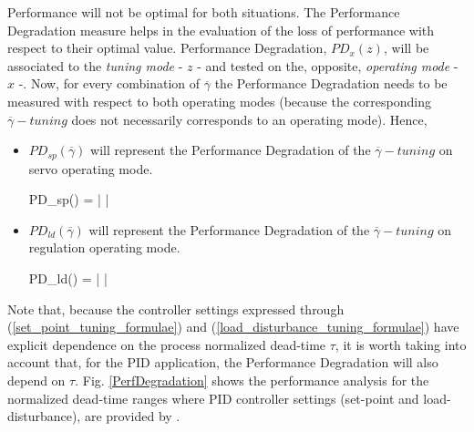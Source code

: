 Performance will not be optimal for both situations. The
Performance Degradation measure helps in the evaluation of the
loss of performance with respect to their optimal value.
Performance Degradation, $PD_x(z)$, will be associated to the
\emph{tuning mode} - $z$ -  and tested on the, opposite,
\emph{operating mode} - $x$ -. Now, for every combination of
$\overline{\gamma}$ the Performance Degradation needs to be
measured with respect to both operating modes (because the
corresponding $\overline{\gamma}-tuning$ does not necessarily
corresponds to an operating mode). Hence,

\begin{itemize}
\item $PD_{sp}(\overline{\gamma})$ will represent the Performance
Degradation of the $\overline{\gamma}-tuning$ on servo operating
mode.

\be PD_{sp}(\overline{\gamma}) = \left |
 \right |
\label{PD_gamma_servo} \ee

\item $PD_{ld}(\overline{\gamma})$ will represent the Performance
Degradation of the $\overline{\gamma}-tuning$ on regulation
operating mode.

\be PD_{ld}(\overline{\gamma}) = \left |
 \right |
\label{PD_gamma_disturbance} \ee
\end{itemize}

Note that, because the controller settings expressed through
(\ref{set_point_tuning_formulae}) and
(\ref{load_disturbance_tuning_formulae}) have explicit dependence
on the process normalized dead-time $\tau$, it is worth taking
into account that, for the PID application, the Performance
Degradation will also depend on $\tau$. Fig. \ref{PerfDegradation}
shows the performance analysis for the normalized dead-time ranges
where PID controller settings (set-point and load-disturbance),
are provided by \cite{zhuangAthertonIEE1993}.

